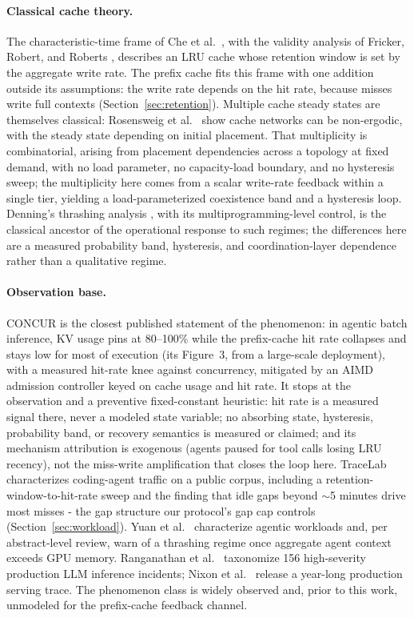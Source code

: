 \paragraph{Classical cache theory.} The characteristic-time frame of Che et al.\
\cite{che2002hierarchical}, with the validity analysis of Fricker, Robert,
and Roberts \cite{fricker2012versatile}, describes an LRU cache whose
retention window is set by the aggregate write rate. The prefix
cache fits this frame with one addition outside its assumptions: the
write rate depends on the hit rate, because misses write full
contexts (Section~\ref{sec:retention}). Multiple cache steady states are themselves
classical: Rosensweig et al.\ \cite{rosensweig2013steady} show cache
networks can be non-ergodic, with the steady state depending on
initial placement. That multiplicity is combinatorial, arising from
placement dependencies across a topology at fixed demand, with no
load parameter, no capacity-load boundary, and no hysteresis sweep;
the multiplicity here comes from a scalar write-rate feedback within
a single tier, yielding a load-parameterized coexistence band and a
hysteresis loop. Denning's thrashing analysis \cite{denning1968thrashing},
with its multiprogramming-level control, is the classical ancestor
of the operational response to such regimes; the differences here
are a measured probability band, hysteresis, and coordination-layer
dependence rather than a qualitative regime.

\paragraph{Observation base.} CONCUR \cite{chen2026concur} is the closest published
statement of the phenomenon: in agentic batch inference, KV usage
pins at 80--100\% while the prefix-cache hit rate collapses and stays
low for most of execution (its Figure~3, from a large-scale
deployment), with a measured hit-rate knee against concurrency,
mitigated by an AIMD admission controller keyed on cache usage and
hit rate. It stops at the observation and a preventive
fixed-constant heuristic: hit rate is a measured signal there, never
a modeled state variable; no absorbing state, hysteresis,
probability band, or recovery semantics is measured or claimed; and
its mechanism attribution is exogenous (agents paused for tool calls
losing LRU recency), not the miss-write amplification that closes
the loop here. TraceLab \cite{zhu2026tracelab} characterizes coding-agent
traffic on a public corpus, including a retention-window-to-hit-rate
sweep and the finding that idle gaps beyond $\sim$5 minutes drive most
misses - the gap structure our protocol's gap cap controls
(Section~\ref{sec:workload}). Yuan et al.\ \cite{yuan2026agentic} characterize agentic
workloads and, per abstract-level review, warn of a thrashing regime
once aggregate agent context exceeds GPU memory. Ranganathan et al.\
\cite{ranganathan2025incidents} taxonomize 156 high-severity production
LLM inference incidents; Nixon et al.\ \cite{nixon2026yearserving} release
a year-long production serving trace. The phenomenon class is widely
observed and, prior to this work, unmodeled for the prefix-cache
feedback channel.
